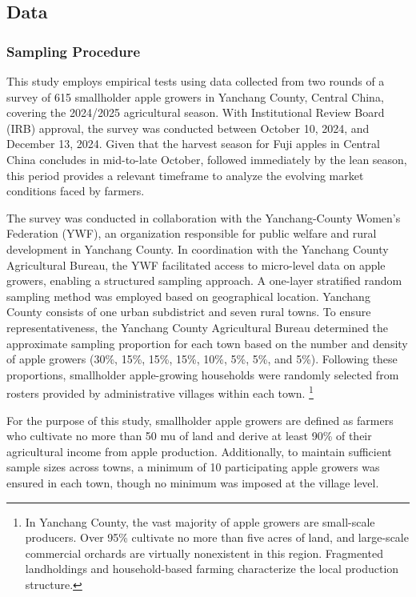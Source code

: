 \documentclass[12pt]{article}
\begin{document}
\subsection{Data}
\subsubsection{Sampling Procedure}
\noindent This study employs empirical tests using data collected from two rounds of a survey of 615 smallholder apple growers in Yanchang County, Central China, covering the 2024/2025 agricultural season. With Institutional Review Board (IRB) approval, the survey was conducted between October 10, 2024, and December 13, 2024. Given that the harvest season for Fuji apples in Central China concludes in mid-to-late October, followed immediately by the lean season, this period provides a relevant timeframe to analyze the evolving market conditions faced by farmers.

The survey was conducted in collaboration with the Yanchang-County Women's Federation (YWF), an organization responsible for public welfare and rural development in Yanchang County. In coordination with the Yanchang County Agricultural Bureau, the YWF facilitated access to micro-level data on apple growers, enabling a structured sampling approach. A one-layer stratified random sampling method was employed based on geographical location. Yanchang County consists of one urban subdistrict and seven rural towns. To ensure representativeness, the Yanchang County Agricultural Bureau determined the approximate sampling proportion for each town based on the number and density of apple growers (30\%, 15\%, 15\%, 15\%, 10\%, 5\%, 5\%, and 5\%). Following these proportions, smallholder apple-growing households were randomly selected from rosters provided by administrative villages within each town. \footnote{In Yanchang County, the vast majority of apple growers are small-scale producers. Over 95\% cultivate no more than five acres of land, and large-scale commercial orchards are virtually nonexistent in this region. Fragmented landholdings and household-based farming characterize the local production structure.}

For the purpose of this study, smallholder apple growers are defined as farmers who cultivate no more than 50 mu of land and derive at least 90\% of their agricultural income from apple production. Additionally, to maintain sufficient sample sizes across towns, a minimum of 10 participating apple growers was ensured in each town, though no minimum was imposed at the village level.
\end{document}
